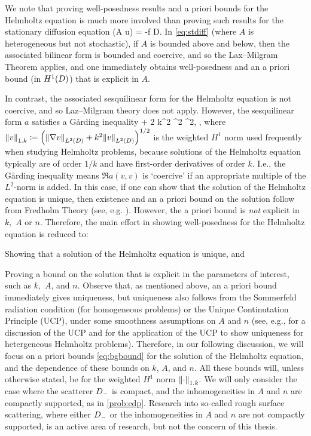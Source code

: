 We note that proving well-posedness results and a priori bounds for the Helmholtz equation is much more involved than proving such results for the stationary diffusion equation
\beq\label{eq:stdiff}
\grad \cdot \mleft(A \grad u\mright) = -f \tin D.
\eeq
In \eqref{eq:stdiff} (where $A$ is heterogeneous but not stochastic), if $A$ is bounded above and below, then the associated bilinear form is bounded and coercive, and so the Lax--Milgram Theorem applies, and one immediately obtains well-posedness and an a priori bound (in $\HoD$) that is explicit in $A$.

In contrast, the associated sesquilinear form for the Helmholtz equation is not coercive, and so Laz--Milgram theory does not apply. However, the sesquilinear form $a$ satisfies a G\r{a}rding inequality
\beq\label{eq:gardingbrief}
 + 2 k^2 \nmax {}^2 \geq {}^2,
\eeq
, where $\NW{v} \de \mleft(\NLtD{\grad v} + k^2 \NLtD{v}\mright)^{1/2}$ is the weighted $H^1$ norm used frequently when studying Helmholtz problems, because solutions of the Helmholtz equation typically are of order $1/k$ and have first-order derivatives of order $k$. I.e., the G\r{a}rding inequality means $\Re{a(v,v)}$ is `coercive' if an appropriate multiple of the $L^2$-norm is added. In this case, if one can show that the solution of the Helmholtz equation is unique, then existence and an a priori bound on the solution follow from Fredholm Theory (see, e.g. \cite[Theorems 5.10 and 5.18]{Sp:15}). However, the a priori bound is \emph{not} explicit in $k,$ $A$ or $n$. Therefore, the main effort in showing well-posedness for the Helmholtz equation is reduced to:
\ben
\item Showing that a solution of the Helmholtz equation is unique, and
  \item Proving a bound on the solution that is explicit in the parameters of interest, such as $k,$ $A$, and $n$.
    \een
    Observe that, as mentioned above, an a priori bound immediately gives uniqueness, but uniqueness also follows from the Sommerfeld radiation condition (for homogeneous problems) or the Unique Continutation Principle (UCP), under some smoothness assumptions on $A$ and $n$ (see, e.g., \cite[p. 2871]{GrPeSp:19} for a discussion of the UCP and \cite[Section 2]{GrSa:18} for the application of the UCP to show uniqueness for hetergeneous Helmholtz problems). Therefore, in our following discussion, we will focus on a priori bounds \eqref{eq:bgbound} for the solution of the Helmholtz equation, and the dependence of these bounds on $k$, $A$, and $n.$ All these bounds will, unless otherwise stated, be for the weighted $H^1$ norm $\NW{\cdot}.$ We will only consider the case where the scatterer $D_{-}$ is compact, and the inhomogeneities in $A$ and $n$ are compactly supported, as in \cref{prob:edp}. Research into so-called rough surface scattering, where either $D_{-}$ or the inhomogeneities in $A$ and $n$ are not compactly supported, is an active area of research, but not the concern of this thesis.

